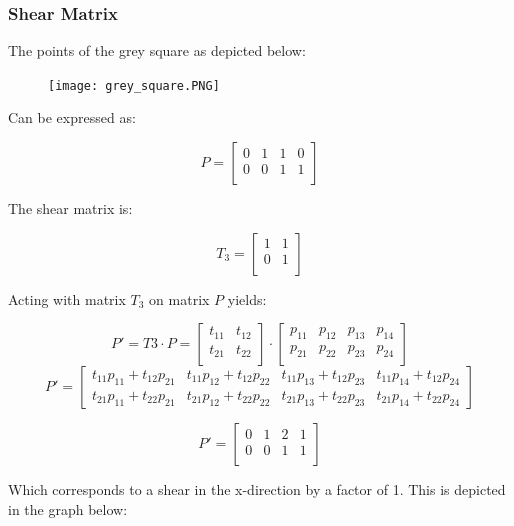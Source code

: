\documentclass{article}
\begin{document}
\subsubsection*{Shear Matrix}

The points of the grey square as depicted below:

\begin{figure}[!htb]
  \centering
  \texttt{[image: grey\_square.PNG]}
  \label{fig3}
\end{figure}

Can be expressed as:

\[P = 
\begin{bmatrix}
    0 & 1 & 1 & 0 \\
    0 & 0 & 1 & 1 \\
\end{bmatrix}
\]

The shear matrix is:

\[T_{3} = 
\begin{bmatrix}
    1 & 1  \\
    0 & 1  \\
\end{bmatrix}
\]

Acting with matrix $T_3$ on matrix $P$ yields:

\[ 
P' = T3 \cdot P = \begin{bmatrix}
t_{11} & t_{12} \\
t_{21} & t_{22} \\
\end{bmatrix} \cdot \begin{bmatrix}
p_{11} & p_{12} & p_{13} & p_{14} \\
p_{21} & p_{22} & p_{23} & p_{24} \\
\end{bmatrix}
\]
\[P' =  
\begin{bmatrix}
    t_{11}p_{11} + t_{12}p_{21} & t_{11}p_{12} + t_{12}p_{22} & t_{11}p_{13} + t_{12}p_{23} & t_{11}p_{14} + t_{12}p_{24} \\
    t_{21}p_{11} + t_{22}p_{21} & t_{21}p_{12} + t_{22}p_{22} & t_{21}p_{13} + t_{22}p_{23} & t_{21}p_{14} + t_{22}p_{24}
\end{bmatrix}
\]

\[P' = 
\begin{bmatrix}
    0 & 1 & 2 & 1 \\
    0 & 0 & 1 & 1 \\
\end{bmatrix}
\]

Which corresponds to a shear in the x-direction by a factor of 1. This is depicted in the graph below:
\end{document}
